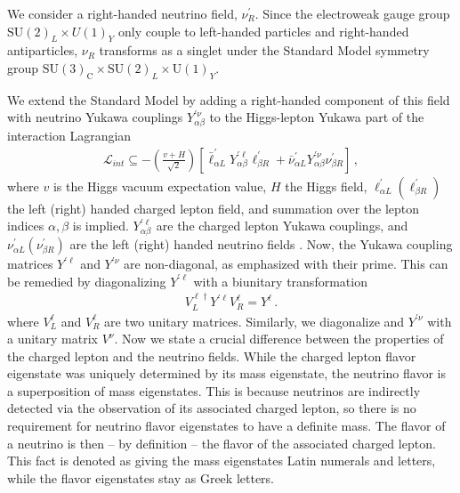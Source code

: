 We consider a right-handed neutrino field, $\nu^\prime_R$. Since the electroweak gauge group $\text{SU}(2)_L \times U(1)_Y$ only couple to 
left-handed particles and right-handed antiparticles, $\nu_R$ transforms as a singlet under the Standard Model symmetry 
group $\mathrm{SU}(3)_{\mathrm{C}} \times \mathrm{SU}(2)_{L} \times \mathrm{U}(1)_{Y}$. 

We extend the Standard Model by adding a right-handed component of this field with neutrino Yukawa couplings $Y_{\alpha \beta}^{\prime \nu}$ to the Higgs-lepton Yukawa part of the interaction Lagrangian 
\begin{align} 
    \mathcal{L}_{int} \subseteq -\left( \frac{v + H}{\sqrt{2}} \right) \left[ \bar{\ell}^{\prime}_{\alpha L} Y_{\alpha \beta}^{\prime \ell} \ell_{\beta R}^{\prime} + \bar{\nu}_{\alpha L}^{\prime} Y_{\alpha \beta}^{\prime \nu} \nu_{\beta R}^{\prime}\right]\,,
\end{align}
where $v$ is the Higgs vacuum expectation value, $H$ the Higgs field, $\ell_{\alpha L}^\prime (\ell_{\beta R}^\prime)$ the left (right) handed charged lepton field, and summation over the lepton indices $\alpha,\beta$ is implied. $Y_{\alpha \beta}^{\prime \ell}$ are the charged lepton Yukawa couplings, and $\nu^\prime_{\alpha L}(\nu^\prime_{\beta R})$ are the left (right) handed neutrino fields .
Now, the Yukawa coupling matrices $Y^{\prime \ell}$ and $Y^{\prime \nu}$ are non-diagonal, as emphasized with their prime. 
This can be remedied by diagonalizing $Y^{\prime \ell}$  with a biunitary transformation
\begin{align}
    V_{ L}^{\ell \dagger} Y^{\prime \ell} V_{ R}^{\ell}=Y^{\ell} \,.
\end{align}
where $V^\ell_L$ and $V^\ell_R$ are two unitary matrices.
Similarly, we diagonalize and $Y^{\prime \nu}$ with a unitary matrix $V^\nu$. 
Now we state a crucial difference between the properties of the charged lepton and the neutrino fields.
While the charged lepton flavor eigenstate was uniquely determined by its mass eigenstate, the neutrino flavor is a superposition of mass eigenstates. 
This is because neutrinos are indirectly detected via the observation of its associated charged lepton, so there is no requirement for neutrino flavor eigenstates to have a definite mass. 
The flavor of a neutrino is then -- by definition -- the flavor of the associated charged lepton. 
This fact is denoted as giving the mass eigenstates Latin numerals and letters, while the flavor eigenstates stay as Greek letters.

